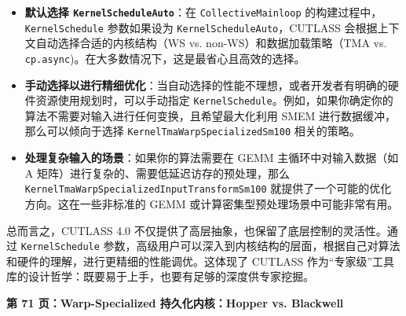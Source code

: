 \begin{itemize}
\item \textbf{默认选择 \texttt{Kernel\allowbreak{}Schedule\allowbreak{}Auto}}：在 \texttt{Collective\allowbreak{}Mainloop} 的构建过程中，\texttt{Kernel\allowbreak{}Schedule} 参数如果设为 \texttt{Kernel\allowbreak{}Schedule\allowbreak{}Auto}，CUTLASS 会根据上下文自动选择合适的内核结构（WS vs. non-WS）和数据加载策略（TMA vs. \texttt{cp.\allowbreak{}async})。在大多数情况下，这是最省心且高效的选择。
\item \textbf{手动选择以进行精细优化}：当自动选择的性能不理想，或者开发者有明确的硬件资源使用规划时，可以手动指定 \texttt{Kernel\allowbreak{}Schedule}。例如，如果你确定你的算法不需要对输入进行任何变换，且希望最大化利用 SMEM 进行数据缓冲，那么可以倾向于选择 \texttt{K\allowbreak{}e\allowbreak{}r\allowbreak{}n\allowbreak{}e\allowbreak{}l\allowbreak{}T\allowbreak{}m\allowbreak{}a\allowbreak{}W\allowbreak{}a\allowbreak{}r\allowbreak{}p\allowbreak{}S\allowbreak{}p\allowbreak{}e\allowbreak{}c\allowbreak{}i\allowbreak{}a\allowbreak{}l\allowbreak{}i\allowbreak{}z\allowbreak{}e\allowbreak{}d\allowbreak{}S\allowbreak{}m\allowbreak{}1\allowbreak{}0\allowbreak{}0} 相关的策略。
\item \textbf{处理复杂输入的场景}：如果你的算法需要在 GEMM 主循环中对输入数据（如 A 矩阵）进行复杂的、需要低延迟访存的预处理，那么 \texttt{K\allowbreak{}e\allowbreak{}r\allowbreak{}n\allowbreak{}e\allowbreak{}l\allowbreak{}T\allowbreak{}m\allowbreak{}a\allowbreak{}W\allowbreak{}a\allowbreak{}r\allowbreak{}p\allowbreak{}S\allowbreak{}p\allowbreak{}e\allowbreak{}c\allowbreak{}i\allowbreak{}a\allowbreak{}l\allowbreak{}i\allowbreak{}z\allowbreak{}e\allowbreak{}d\allowbreak{}I\allowbreak{}n\allowbreak{}p\allowbreak{}u\allowbreak{}t\allowbreak{}T\allowbreak{}r\allowbreak{}a\allowbreak{}n\allowbreak{}s\allowbreak{}f\allowbreak{}o\allowbreak{}r\allowbreak{}m\allowbreak{}S\allowbreak{}m\allowbreak{}1\allowbreak{}0\allowbreak{}0} 就提供了一个可能的优化方向。这在一些非标准的 GEMM 或计算密集型预处理场景中可能非常有用。
\end{itemize}

总而言之，CUTLASS 4.0 不仅提供了高层抽象，也保留了底层控制的灵活性。通过 \texttt{Kernel\allowbreak{}Schedule} 参数，高级用户可以深入到内核结构的层面，根据自己对算法和硬件的理解，进行更精细的性能调优。这体现了 CUTLASS 作为“专家级”工具库的设计哲学：既要易于上手，也要有足够的深度供专家挖掘。

\textbf{第 71 页：Warp-Specialized 持久化内核：Hopper vs. Blackwell}

